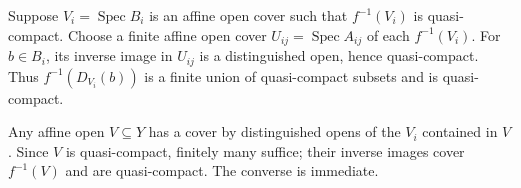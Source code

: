Suppose $V_i=\operatorname{Spec}B_i$ is an affine open cover such that $f^{-1}(V_i)$ is quasi-compact. Choose a finite affine open cover $U_{ij}=\operatorname{Spec}A_{ij}$ of each $f^{-1}(V_i)$. For $b\in B_i$, its inverse image in $U_{ij}$ is a distinguished open, hence quasi-compact. Thus $f^{-1}(D_{V_i}(b))$ is a finite union of quasi-compact subsets and is quasi-compact.

Any affine open $V\subseteq Y$ has a cover by distinguished opens of the $V_i$ contained in $V$. Since $V$ is quasi-compact, finitely many suffice; their inverse images cover $f^{-1}(V)$ and are quasi-compact. The converse is immediate.
